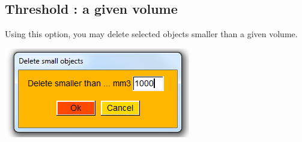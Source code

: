 \subsection{Threshold : a given volume}
\noindent
\begin{minipage}{0.5\textwidth}
Using this option, you may delete selected objects smaller than a given volume.

\end{minipage}    
\begin{minipage}{0.5\textwidth}\centering
  \includegraphics[scale=0.5]{images/Edit_selected_objects/Delete_small_2.png}
 \end{minipage} 
\noindent

